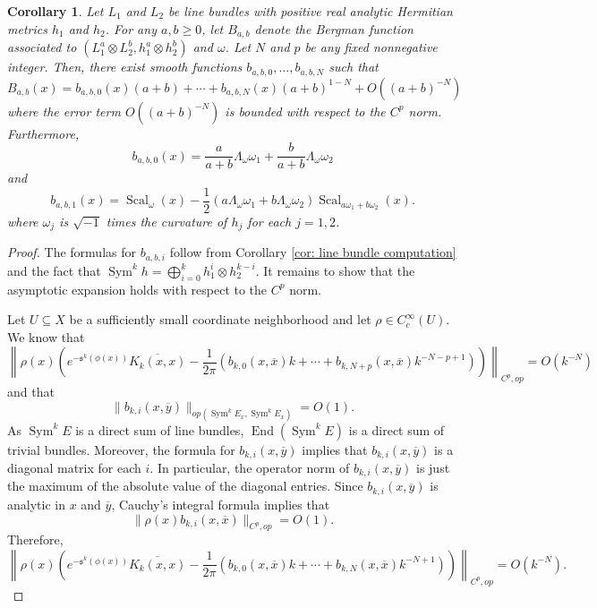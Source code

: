 \documentclass{amsart}
\newtheorem{cor}[thm]{Corollary}
\theoremstyle{definition}
\theoremstyle{remark}
\numberwithin{equation}{section}
\DeclareMathOperator{\Sym}{Sym}
\DeclareMathOperator{\End}{End}
\DeclareMathOperator{\Scal}{Scal}
\begin{document}
\begin{cor} \label{cor: direct sum}
Let $L_1$ and $L_2$ be line bundles with positive real analytic Hermitian metrics $h_1$ and $h_2$. For any $a,b \geq 0$, let $B_{a,b}$ denote the Bergman function associated to $(L_1^a \otimes L_2^b, h_1^a \otimes h_2^b)$ and $\omega$. Let $N$ and $p$ be any fixed nonnegative integer. Then, there exist smooth functions $b_{a,b,0}, \dotsc, b_{a,b,N}$ such that
\begin{equation*}
    B_{a,b}(x) = b_{a,b,0}(x)(a+b) + \dotsb + b_{a,b,N}(x) (a+b)^{1-N} + O \left ((a+b)^{-N} \right )
\end{equation*}
where the error term $O \left ((a+b)^{-N} \right )$ is bounded with respect to the $C^p$ norm. Furthermore,
\begin{equation*}
    b_{a,b,0}(x) = \frac{a}{a+b} \Lambda_\omega \omega_1 + \frac{b}{a+b} \Lambda_\omega \omega_2
\end{equation*}
and
\begin{equation*}
b_{a,b,1}(x) = \Scal_\omega(x) -\frac{1}{2}  \left ( a \Lambda_\omega \omega_1 + b \Lambda_\omega \omega_2 \right ) \Scal_{a\omega_1 + b\omega_2}(x). 
\end{equation*}
where $\omega_j$ is $\sqrt{-1}$ times the curvature of $h_j$ for each $j=1,2$.
\end{cor}
\begin{proof}
The formulas for $b_{a,b,i}$ follow from Corollary \ref{cor: line bundle computation} and the fact that $\Sym^k h = \bigoplus_{i=0}^k h_1^i \otimes h_2^{k-i}$. It remains to show that the asymptotic expansion holds with respect to the $C^p$ norm.


Let $U \subseteq X$ be a sufficiently small coordinate neighborhood and let $\rho \in C_c^\infty(U)$. We know that
\begin{equation*}
\left \|\rho(x) \left ( e^{-\mathfrak{s}^k(\phi(x))} \overline{K_k(x,x)} - \frac{1}{2\pi} \left ( b_{k,0}(x,\overline{x})k + \dotsb + b_{k,N+p}(x,\overline{x}) k^{-N-p+1} \right) \right) \right \|_{C^p,op} = O(k^{-N})
\end{equation*}
and that
\begin{equation*}
    \|b_{k,i}(x,\overline{y})\|_{op(\Sym^k E_x,\Sym^k E_x)} = O(1).
\end{equation*}
As $\Sym^k E$ is a direct sum of line bundles, $\End(\Sym^k E)$ is a direct sum of trivial bundles. Moreover, the formula for $b_{k,i}(x,\overline{y})$ implies that $b_{k,i}(x,\overline{y})$ is a diagonal matrix for each $i$. In particular, the operator norm of $b_{k,i}(x,\overline{y})$ is just the maximum of the absolute value of the diagonal entries. Since $b_{k,i}(x,\overline{y})$ is analytic in $x$ and $\overline{y}$, Cauchy's integral formula implies that
\begin{equation*}
    \|\rho(x) b_{k,i}(x,\overline{x})\|_{C^p,op} = O(1).
\end{equation*}
Therefore,
$$
\left \|\rho(x) \left ( e^{-\mathfrak{s}^k(\phi(x))} \overline{K_k(x,x)} - \frac{1}{2\pi} \left ( b_{k,0}(x,\overline{x})k + \dotsb + b_{k,N}(x,\overline{x}) k^{-N+1} \right) \right) \right \|_{C^p,op} = O(k^{-N}).
$$


\end{proof}
\end{document}
